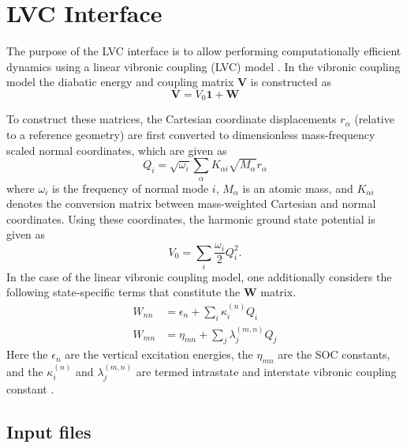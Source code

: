 \documentclass[a4paper,10pt,DIV=15,openany]{scrbook}
\begin{document}

\section{LVC Interface}\label{sec:int:lvc}

The purpose of the LVC interface is to allow performing computationally efficient dynamics using a linear vibronic coupling (LVC) model \cite{Koeppel84ACP}.
In the vibronic coupling model the diabatic energy and coupling matrix $\mathbf{V}$ is constructed as
\begin{equation}
\label{eq:V}
\mathbf{V}=
V_0\mathbf{1}+\mathbf{W}
\end{equation}

To construct these matrices, the Cartesian coordinate displacements $r_{\alpha}$ (relative to a reference geometry) are first converted to dimensionless mass-frequency scaled normal coordinates, which are given as
%
\begin{equation}
\label{eq:Qi}
Q_i=\sqrt{\omega_i}\sum_\alpha K_{\alpha i}\sqrt{M_\alpha}r_{\alpha}
\end{equation}
%
where $\omega_i$ is the frequency of normal mode $i$, $M_\alpha$ is an atomic mass, and $K_{\alpha i}$ denotes the conversion matrix between mass-weighted Cartesian and normal coordinates.
Using these coordinates, the harmonic ground state potential is given as
%
\begin{equation}
\label{eq:V0Qi}
V_0= \sum_i \dfrac{\omega_i}{2}Q_i^2
.
\end{equation}
%
In the case of the linear vibronic coupling model, one additionally considers the following state-specific terms that constitute the $\mathbf{W}$ matrix.
%
\begin{align}
\label{eq:Wnn}
W_{nn}&=\epsilon_n + \sum_i\kappa_i^{(n)}Q_i\\
\label{eq:Wmn}
W_{mn}&=\eta_{mn}+\sum_j\lambda_j^{(m,n)}Q_j
\end{align}
%
Here the $\epsilon_n$ are the vertical excitation energies, the $\eta_{mn}$ are the SOC constants, and the $\kappa_i^{(n)}$ and $\lambda_j^{(m,n)}$ are termed intrastate and interstate vibronic coupling constant \cite{Koeppel84ACP}.

\subsection{Input files}
\end{document}
